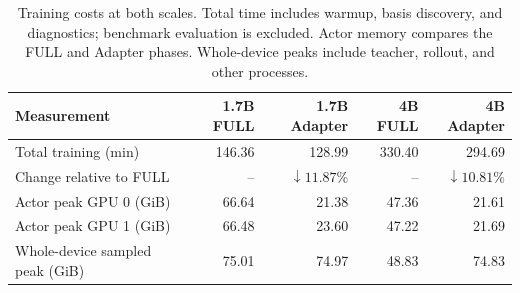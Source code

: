 \begin{table}[!htbp]
\centering
\caption{Training costs at both scales. Total time includes warmup, basis discovery, and diagnostics; benchmark evaluation is excluded. Actor memory compares the FULL and Adapter phases. Whole-device peaks include teacher, rollout, and other processes.}
\label{tab:two_scale_adapter_cost}
\small
\setlength{\tabcolsep}{3pt}
\begin{tabular}{lrrrr}
\toprule
Measurement & 1.7B FULL & 1.7B Adapter & 4B FULL & 4B Adapter \\
\midrule
Total training (min) & 146.36 & 128.99 & 330.40 & 294.69 \\
Change relative to FULL & -- & $\boldsymbol{\downarrow 11.87\%}$ & -- & $\boldsymbol{\downarrow 10.81\%}$ \\
Actor peak GPU 0 (GiB) & 66.64 & 21.38 & 47.36 & 21.61 \\
Actor peak GPU 1 (GiB) & 66.48 & 23.60 & 47.22 & 21.69 \\
Whole-device sampled peak (GiB) & 75.01 & 74.97 & 48.83 & 74.83 \\
\bottomrule
\end{tabular}
\end{table}
